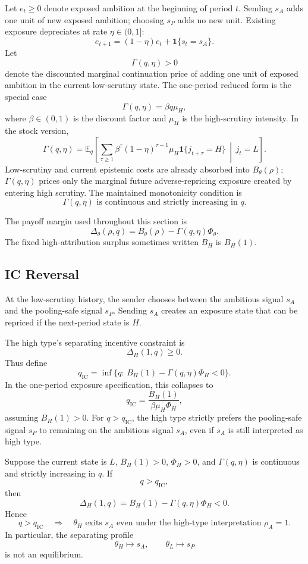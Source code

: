 Let \(e_t\ge 0\) denote exposed ambition at the beginning of period \(t\). Sending \(s_A\) adds one unit of new exposed ambition; choosing \(s_P\) adds no new unit. Existing exposure depreciates at rate \(\eta\in(0,1]\):
\[
e_{t+1}=(1-\eta)e_t+\mathbf{1}\{s_t=s_A\}.
\]
Let
\[
\Gamma(q,\eta)>0
\]
denote the discounted marginal continuation price of adding one unit of exposed ambition in the current low-scrutiny state. The one-period reduced form is the special case
\[
\Gamma(q,\eta)=\beta q\mu_H,
\]
where \(\beta\in(0,1)\) is the discount factor and \(\mu_H\) is the high-scrutiny intensity. In the stock version,
\[
\Gamma(q,\eta)
=
\mathbb E_q\left[
\sum_{\tau\ge 1}
\beta^\tau (1-\eta)^{\tau-1}
\mu_H\mathbf{1}\{j_{t+\tau}=H\}
\,\middle|\,j_t=L
\right].
\]
Low-scrutiny and current epistemic costs are already absorbed into \(B_\theta(\rho)\); \(\Gamma(q,\eta)\) prices only the marginal future adverse-repricing exposure created by entering high scrutiny. The maintained monotonicity condition is
\[
\Gamma(q,\eta)\text{ is continuous and strictly increasing in }q.
\]

The payoff margin used throughout this section is
\[
\Delta_\theta(\rho,q)
=
B_\theta(\rho)-\Gamma(q,\eta)\Phi_\theta.
\]
The fixed high-attribution surplus sometimes written \(B_H\) is \(B_H(1)\).

\subsection{IC Reversal}
\label{subsec:ic-reversal}
\label{subsec:anticipatory-incentive-failure}

At the low-scrutiny history, the sender chooses between the ambitious signal \(s_A\) and the pooling-safe signal \(s_P\). Sending \(s_A\) creates an exposure state that can be repriced if the next-period state is \(H\).

The high type's separating incentive constraint is
\[
\Delta_H(1,q)\ge 0.
\]
Thus define
\[
q_{\mathrm{IC}}
=
\inf\{q:\,B_H(1)-\Gamma(q,\eta)\Phi_H<0\}.
\]
In the one-period exposure specification, this collapses to
\[
q_{\mathrm{IC}}=\frac{B_H(1)}{\beta\mu_H\Phi_H},
\]
assuming \(B_H(1)>0\). For \(q>q_{\mathrm{IC}}\), the high type strictly prefers the pooling-safe signal \(s_P\) to remaining on the ambitious signal \(s_A\), even if \(s_A\) is still interpreted as high type.

\begin{proposition}[IC reversal]
\label{prop:ic-reversal}
\label{lem:anticipatory-incentive-failure}
\label{lem:general-price-ic-reversal}
Suppose the current state is \(L\), \(B_H(1)>0\), \(\Phi_H>0\), and \(\Gamma(q,\eta)\) is continuous and strictly increasing in \(q\). If
\[
q>q_{\mathrm{IC}},
\]
then
\[
\Delta_H(1,q)=B_H(1)-\Gamma(q,\eta)\Phi_H<0.
\]
Hence
\[
q>q_{\mathrm{IC}}
\quad\Rightarrow\quad
\theta_H \text{ exits } s_A
\text{ even under the high-type interpretation } \rho_A=1.
\]
In particular, the separating profile
\[
\theta_H\mapsto s_A,
\qquad
\theta_L\mapsto s_P
\]
is not an equilibrium.
\end{proposition}

